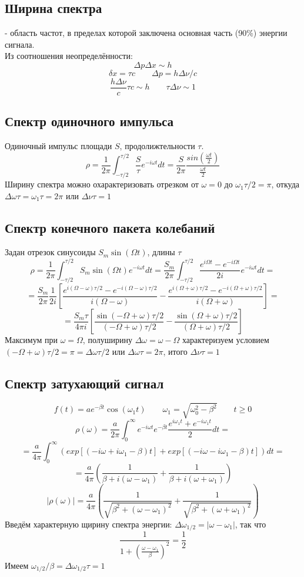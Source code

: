 \documentclass{article}
\begin{document}
\subsection{Ширина спектра}
- область частот, в пределах которой заключена основная часть (90\%) энергии сигнала. \\
Из соотношения неопределённости:
\[\Delta p\Delta x\sim h\]
\[\delta x = \tau c \qquad \Delta p = h\Delta \nu/c\]
\[\frac{h \Delta \nu}{c}\tau c \sim h \qquad \tau \Delta \nu \sim 1\]
\subsection{Спектр одиночного импульса}
Одиночный импульс площади $S$, продолижтельности $\tau$.
\[\rho=\frac{1}{2\pi}\int_{-\tau/2}^{\tau/2}\frac{S}{\tau}e^{-i\omega t}dt=\frac{S}{2\pi}\frac{sin(\frac{\omega t}{2})}{\frac{\omega t}{2}}\]
Ширину спектра можно охарактеризовать отрезком от $\omega=0$ до $\omega_1\tau/2=\pi$, откуда $\Delta \omega \tau=\omega_1\tau=2\pi$ или $\Delta\nu \tau =1$
\subsection{Спектр конечного пакета колебаний}
Задан отрезок синусоиды $S_m\sin(\Omega t)$, длины $\tau$
\[\rho=\frac{1}{2\pi}\int_{-\tau/2}^{\tau/2}S_m\sin(\Omega t)e^{-i\omega t}dt=\frac{S_m}{2\pi}\int_{-\tau/2}^{\tau/2}\frac{e^{i\Omega t}-e^{-i\Omega t}}{2i}e^{-i\omega t}dt=\]
\[=\frac{S_m}{2\pi}\frac{1}{2i}[\frac{e^{i(\Omega-\omega)\tau/2}-e^{-i(\Omega-\omega)\tau/2}}{i(\Omega-\omega)}-\frac{e^{i(\Omega+\omega)\tau/2}-e^{-i(\Omega+\omega)\tau/2}}{i(\Omega+\omega)}]=\]
\[=\frac{S_m\tau}{4\pi i}[\frac{\sin(-\Omega+\omega)\tau/2}{(-\Omega+\omega)\tau/2}-\frac{\sin(\Omega+\omega)\tau/2}{(\Omega+\omega)\tau/2}]\]
Максимум при $\omega=\Omega$, полуширину $\Delta\omega=\omega-\Omega$ характеризуем условием $(-\Omega+\omega)\tau/2=\pi=\Delta\omega\tau/2$ или $\Delta \omega \tau = 2 \pi$, итого $\Delta \nu \tau = 1$
\subsection{Спектр затухающий сигнал}
\[f(t)=ae^{-\beta t}\cos(\omega_1 t) \qquad \omega_1=\sqrt{\omega_0^2-\beta^2} \qquad t \ge 0\]
\[\rho(\omega)=\frac{a}{2\pi}\int_{0}^{\infty}e^{-i\omega t}e^{-\beta t}\frac{e^{i\omega_1 t}+e^{-i\omega_1 t}}{2}dt=\]
\[=\frac{a}{4\pi}\int_{0}^{\infty}(exp[(-i\omega+i\omega_1 - \beta)t]+exp[(-i\omega-i\omega_1 - \beta)t])dt=\]
\[=\frac{a}{4\pi}(\frac{1}{\beta+i(\omega-\omega_1)}+\frac{1}{\beta+i(\omega+\omega_1)})\]
\[|\rho(\omega)|=\frac{a}{4\pi}(\frac{1}{\sqrt{\beta^2+(\omega-\omega_1)^2}}+\frac{1}{\sqrt{\beta^2+(\omega+\omega_1)^2}})\]
Введём характерную щирину спектра энергии: $\Delta \omega_{1/2}=|\omega-\omega_1|$, так что
\[\frac{1}{1+(\frac{\omega-\omega_1}{\beta})^2}=\frac{1}{2}\]
Имеем $\omega_{1/2}/\beta=\Delta\omega_{1/2}\tau=1$
\end{document}
